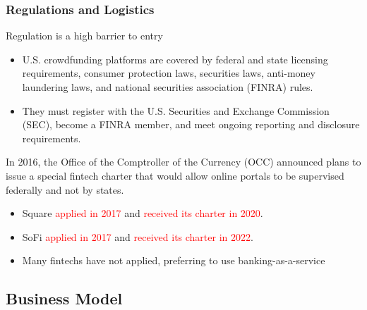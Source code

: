 \documentclass[aspectratio=169,xcolor=dvipsnames]{beamer}
\begin{document}






\begin{frame}
\frametitle{Regulations and Logistics}

Regulation is a high barrier to entry
\begin{itemize}
        \item U.S. crowdfunding platforms are covered by federal and state licensing requirements, consumer protection laws, securities laws, anti-money laundering laws, and national securities association (FINRA) rules.
        \item They must register with the U.S. Securities and Exchange Commission (SEC), become a FINRA member, and meet ongoing reporting and disclosure requirements.
    \end{itemize}

\medskip 

In 2016, the Office of the Comptroller of the Currency (OCC) announced plans to issue a special fintech charter that would allow online portals to be supervised federally and not by states.
\begin{itemize}
    \item Square \textcolor{red}{applied in 2017} and \textcolor{red}{received its charter in 2020}.
    \item SoFi \textcolor{red}{applied in 2017} and \textcolor{red}{received its charter in 2022}.
    \item Many fintechs have not applied, preferring to use banking-as-a-service 
\end{itemize}



\end{frame} 

\subsection{Business Model}



\end{document}
